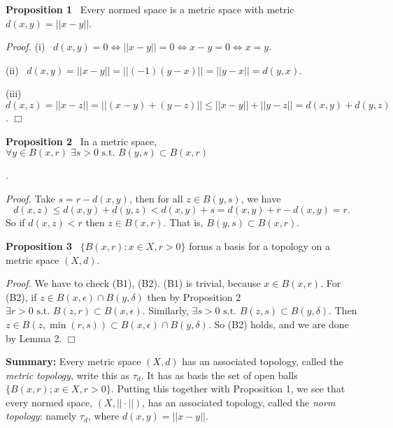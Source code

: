 \documentclass[12pt]{article}
\newcommand{\st}[0]{ \textrm{ s.t. } }
\newcommand{\lrimply}[0] { \Leftrightarrow }
\newcommand{\eps}[0] {  \epsilon }
\begin{document}
\begin{flushleft}
\begin{enumerate}
            \end{enumerate}\end{flushleft}\begin{flushleft} 
 { \bf Proposition  1 } \ Every normed space is a metric space with metric
 $d(x,y) = ||x-y||$.\begin{flushleft} 
 \emph{Proof.  }(i) \ $ d(x,y)=0 \lrimply ||x-y||=0 \lrimply x-y = 0 \lrimply x=y$.

 (ii) \ $d(x,y) = ||x-y|| = ||(-1)(y-x)|| = ||y-x|| = d(y,x)$. 

 (iii) \ $d(x,z) = ||x-z|| = ||(x-y)+(y-z)|| \le ||x-y|| + ||y - z|| = d(x,y) + d(y,z)$. $\Box$ \end{flushleft}\end{flushleft}\begin{flushleft} 
 { \bf Proposition  2 } \ In a metric space,
$\forall y \in B(x,r) \; \exists s > 0 \st B(y,s) \subset B(x,r)$\begin{flushleft}.

 \emph{Proof.  }Take $s = r - d(x,y)$, then for all $z \in B(y, s)$, we have
$$d(x,z) \le d(x,y) + d(y,z) < d(x,y) + s = d(x,y) + r - d(x,y) = r .$$ 
So if  $d(x,z) < r$ then $z \in B(x,r)$.  That is, $B(y,s) \subset B(x,r)$.
\end{flushleft}\end{flushleft}\begin{flushleft} 
 { \bf Proposition 3 } \ $\{ B(x, r) :  x \in X, r>0 \}$ forms a basis for a topology on a metric space $(X, d)$.\begin{flushleft} 
 \emph{Proof.  }We have to check (B1), (B2). (B1) is trivial, because $x \in B(x,r)$. For (B2), 
 if $ z \in B(x,\eps) \cap B(y,\delta)$ then by Proposition 2 
$\exists r>0 \st B(z,r) \subset B(x,\eps)$.  Similarly, $\exists s>0 \st B(z,s) \subset B(y,\delta)$. Then $z \in B(z, \min(r,s)) \subset B(x,\eps) \cap B(y,\delta)$.  So (B2) holds, and we are done by Lemma 2. $\Box$
\end{flushleft}\end{flushleft}\begin{flushleft} 
{\bf  Summary:} Every metric space $(X, d)$ has an associated topology, called the \emph{metric topology}, write this as $\tau_d$. It has as basis the set of open balls $\{ B(x, r); x \in X, r>0 \}$. Putting this together with 
Proposition 1, we see that every normed space, $(X, || \cdot ||)$, 
has an associated topology, called the \emph{norm topology}: namely $\tau_d$, 
where $d(x,y) = ||x-y||$.\end{flushleft}
\end{document}
